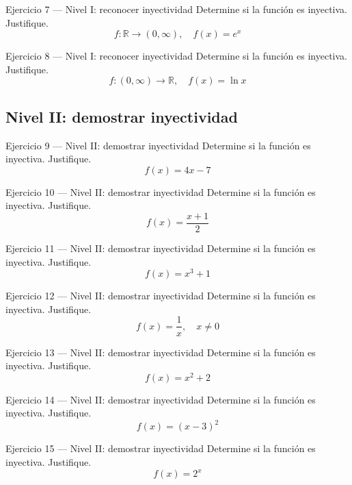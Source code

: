 \documentclass[aspectratio=169,10pt]{beamer}
\begin{document}
\begin{frame}{Ejercicio 7 — Nivel I: reconocer inyectividad}
Determine si la función es inyectiva. Justifique.
\[
f:\mathbb{R}\to(0,\infty),\quad f(x)=e^x
\]
\end{frame}

\begin{frame}{Ejercicio 8 — Nivel I: reconocer inyectividad}
Determine si la función es inyectiva. Justifique.
\[
f:(0,\infty)\to\mathbb{R},\quad f(x)=\ln x
\]
\end{frame}

\subsection{Nivel II: demostrar inyectividad}
\begin{frame}{Ejercicio 9 — Nivel II: demostrar inyectividad}
Determine si la función es inyectiva. Justifique.
\[
f(x)=4x-7
\]
\end{frame}

\begin{frame}{Ejercicio 10 — Nivel II: demostrar inyectividad}
Determine si la función es inyectiva. Justifique.
\[
f(x)=\frac{x+1}{2}
\]
\end{frame}

\begin{frame}{Ejercicio 11 — Nivel II: demostrar inyectividad}
Determine si la función es inyectiva. Justifique.
\[
f(x)=x^3+1
\]
\end{frame}

\begin{frame}{Ejercicio 12 — Nivel II: demostrar inyectividad}
Determine si la función es inyectiva. Justifique.
\[
f(x)=\frac1x,\quad x\ne0
\]
\end{frame}

\begin{frame}{Ejercicio 13 — Nivel II: demostrar inyectividad}
Determine si la función es inyectiva. Justifique.
\[
f(x)=x^2+2
\]
\end{frame}

\begin{frame}{Ejercicio 14 — Nivel II: demostrar inyectividad}
Determine si la función es inyectiva. Justifique.
\[
f(x)=(x-3)^2
\]
\end{frame}

\begin{frame}{Ejercicio 15 — Nivel II: demostrar inyectividad}
Determine si la función es inyectiva. Justifique.
\[
f(x)=2^x
\]
\end{frame}
\end{document}
